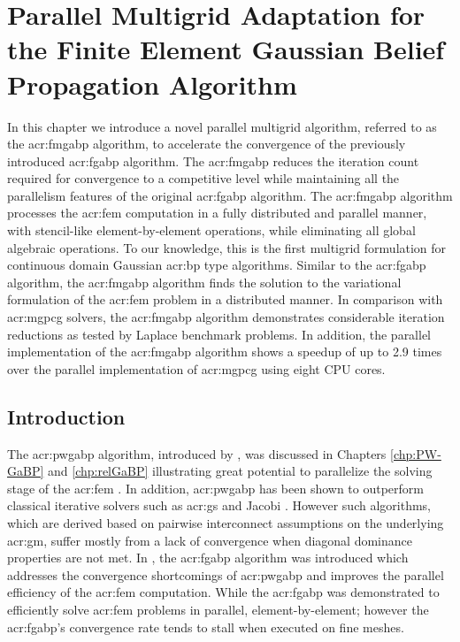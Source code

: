 \graphicspath{{figs/Chp-FMGaBP/}}



\chapter{Parallel Multigrid Adaptation for the Finite Element Gaussian Belief Propagation Algorithm}
\label{chp:FMGaBP}

In this chapter we introduce a novel parallel multigrid algorithm, referred to as the \gls{acr:fmgabp} algorithm, to accelerate the convergence of the previously introduced \gls{acr:fgabp} algorithm.
The \gls{acr:fmgabp} reduces the iteration count required for convergence to a competitive level while maintaining all the parallelism features of the original \gls{acr:fgabp} algorithm.
The \gls{acr:fmgabp} algorithm processes the \gls{acr:fem} computation in a fully distributed and parallel manner, with stencil-like element-by-element operations, while eliminating all global algebraic operations.
To our knowledge, this is the first multigrid formulation for continuous domain Gaussian \gls{acr:bp} type algorithms.
Similar to the \gls{acr:fgabp} algorithm, the \gls{acr:fmgabp} algorithm finds the solution to the variational formulation of the \gls{acr:fem} problem in a distributed manner.
In comparison with \gls{acr:mgpcg} solvers, the \gls{acr:fmgabp} algorithm demonstrates considerable iteration reductions as tested by Laplace benchmark problems.
In addition, the parallel implementation of the \gls{acr:fmgabp} algorithm shows a speedup of up to 2.9 times over the parallel implementation of \gls{acr:mgpcg} using eight CPU cores.


\section{Introduction}
The \gls{acr:pwgabp} algorithm, introduced by \cite{bib:Shental2008GBPSSLE,bib:Weiss01CorrectnessBelief}, was discussed in Chapters \ref{chp:PW-GaBP} and \ref{chp:relGaBP} illustrating great potential to parallelize the solving stage of the \gls{acr:fem} \cite{bib:El-Kurdi2012EIOGBPSFLSDDLS,bib:El-Kurdi2012RGBP}.
In addition, \gls{acr:pwgabp} has been shown to outperform classical iterative solvers such as \gls{acr:gs} and Jacobi \cite{bib:Shental2008GBPSSLE}.
However such algorithms, which are derived based on pairwise interconnect assumptions on the underlying \gls{acr:gm}, suffer mostly from a lack of convergence when diagonal dominance properties are not met.
In , the \gls{acr:fgabp} algorithm was introduced which addresses the convergence shortcomings of \gls{acr:pwgabp} and improves the parallel efficiency of the \gls{acr:fem} computation.
While the \gls{acr:fgabp} was demonstrated to efficiently solve \gls{acr:fem} problems in parallel, element-by-element; however the \gls{acr:fgabp}'s convergence rate tends to stall when executed on fine meshes.


